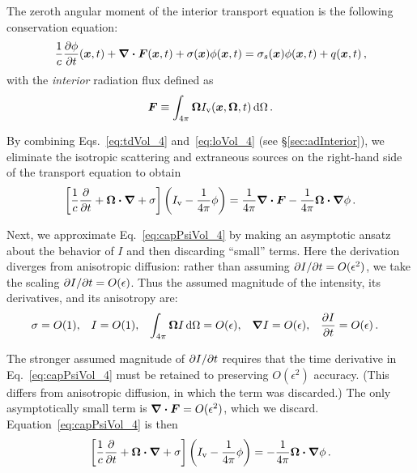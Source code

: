 The zeroth angular moment of the interior transport equation is the following
conservation equation:
\begin{equation} \label{eq:loVol_4}
\frac{1}{c} \frac{\partial \phi}{\partial t} (\bm{x}, t)
  + \bm{\nabla} \bm{\cdot}\bm{F}(\bm{x}, t)
  + \sigma(\bm{x}) \phi(\bm{x}, t)
 = \sigma_s(\bm{x}) \phi(\bm{x},t) + q(\bm{x},t)\,,
\end{equation}
with the \emph{interior} radiation flux defined as
\begin{equation}\label{eq:tdF_4}
  \bm{F} \equiv \int_{4\pi} \bm{\Omega} I_\mathrm{v}(\bm{x}, \bm{\Omega},t) \mathop{}\!\mathrm{d}
  \Omega\,.
\end{equation}

By combining Eqs.~\eqref{eq:tdVol_4} and~\eqref{eq:loVol_4} (see
\S\ref{sec:adInterior}), we eliminate the isotropic scattering and extraneous
sources on
the right-hand side of the transport equation to obtain
\begin{equation}\label{eq:capPsiVol_4}
  \left[ \frac{1}{c}\frac{\partial }{\partial t}
  + \bm{\Omega}\bm{\cdot} \bm{\nabla}
  + \sigma \right]
   \left( I_\mathrm{v}
  - \frac{1}{4\pi} \phi \right)
  = \frac{1}{4\pi} \bm{\nabla} \bm{\cdot}\bm{F} -
  \frac{1}{4\pi} \bm{\Omega}\bm{\cdot} \bm{\nabla} \phi\,.
\end{equation}

Next, we approximate Eq.~\eqref{eq:capPsiVol_4} by making an asymptotic ansatz
about the behavior of $I$ and then discarding ``small'' terms. Here the
derivation diverges from anisotropic diffusion: rather than assuming
${\partial I}/{\partial t} = O(\epsilon^2)$, we take the scaling ${\partial I}/{\partial t} =
O(\epsilon)$. Thus the assumed magnitude of the intensity, its derivatives, and
its anisotropy are:
\begin{align} \label{eq:ap1ansatz}
  \sigma &= O(1), &
  I &= O(1), &
  \int_{4\pi} \bm{\Omega} I \mathop{}\!\mathrm{d}\Omega &= O(\epsilon), &
  \bm{\nabla} I &= O(\epsilon), &
  \frac{\partial I}{\partial t} &= O(\epsilon) \,.
\end{align}

The stronger assumed magnitude of ${\partial I}/{\partial t}$ requires that the time derivative
in Eq.~\eqref{eq:capPsiVol_4} must be retained to preserving $O(\epsilon^2)$
accuracy. (This differs from anisotropic diffusion, in which the term was
discarded.) The only asymptotically
small term is $\bm{\nabla} \bm{\cdot}\bm{F} = O(\epsilon^2)$, which we discard.
Equation~\eqref{eq:capPsiVol_4} is then
\begin{equation*}
  \left[ \frac{1}{c}\frac{\partial }{\partial t}
  + \bm{\Omega}\bm{\cdot} \bm{\nabla}
  + \sigma \right]
   \left( I_\mathrm{v} - \frac{1}{4\pi} \phi \right)
  = - \frac{1}{4\pi} \bm{\Omega}\bm{\cdot} \bm{\nabla} \phi\,.
\end{equation*}

